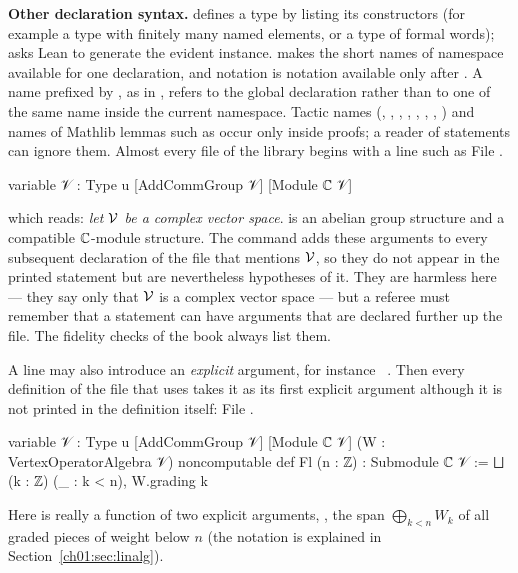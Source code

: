\textbf{Other declaration syntax.}  defines a type by listing its constructors (for
example a type with finitely many named elements, or a type of formal words);  asks Lean to generate the evident instance.  makes the short names of
namespace  available for one declaration, and  notation is notation available
only after . A name prefixed by , as in , refers to the
global declaration rather than to one of the same name inside the current namespace. Tactic names
(, , , , , , , )
and names of Mathlib lemmas such as  occur only inside proofs; a reader of statements
can ignore them.
Almost every file of the library begins with a line such as
\noindent File .
\begin{leancode}
variable {𝒱 : Type u} [AddCommGroup 𝒱] [Module ℂ 𝒱]
\end{leancode}
which reads: \emph{let $\mathcal{V}$ be a complex vector space}.  is an abelian
group structure and  a compatible ${\mathbb{C}}$-module structure. The 
command adds these arguments to every subsequent declaration of the file that mentions $\mathcal{V}$, so
they do not appear in the printed statement but are nevertheless hypotheses of it. They are harmless
here --- they say only that $\mathcal{V}$ is a complex vector space --- but a referee must remember that
a statement can have arguments that are declared further up the file. The fidelity checks of the
book always list them.


A  line may also introduce an \emph{explicit} argument, for instance
\allowbreak\ . Then every definition of the file that uses  takes
it as its first explicit argument although it is not printed in the definition itself:
\noindent File .
\begin{leancode}
variable {𝒱 : Type u} [AddCommGroup 𝒱] [Module ℂ 𝒱] (W : VertexOperatorAlgebra 𝒱)
noncomputable def Fl (n : ℤ) : Submodule ℂ 𝒱 := ⨆ (k : ℤ) (_ : k < n), W.grading k
\end{leancode}
Here  is really a function of two explicit arguments, , the span
$\bigoplus_{k<n}W_k$ of all graded pieces of weight below $n$ (the notation  is explained in
Section~\ref{ch01:sec:linalg}).

